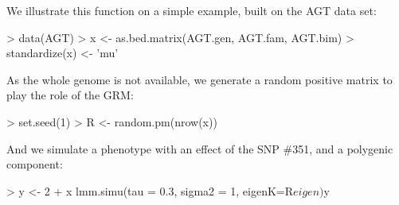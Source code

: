 \documentclass{article}
\renewenvironment{Schunk}{\vspace{\topsep}}{\vspace{\topsep}}
\begin{document}
  We illustrate this function on a simple example, built on the AGT data set:
\begin{Schunk}
\begin{Sinput}
> data(AGT)
> x <- as.bed.matrix(AGT.gen, AGT.fam, AGT.bim)
> standardize(x) <- 'mu'
\end{Sinput}
\end{Schunk}

  As the whole genome is not available, we generate a random positive matrix to play the role of the GRM:
\begin{Schunk}
\begin{Sinput}
> set.seed(1)
> R <- random.pm(nrow(x))
\end{Sinput}
\end{Schunk}

  And we simulate a phenotype with an effect of the SNP \#351, and a polygenic component:
\begin{Schunk}
\begin{Sinput}
> y <- 2 + x %
      lmm.simu(tau = 0.3, sigma2 = 1, eigenK=R$eigen)$y
\end{Sinput}
\end{Schunk}
\end{document}
